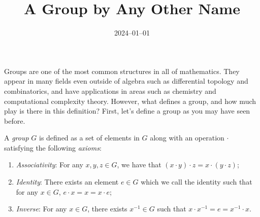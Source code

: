 \documentclass{article}
\title{A Group by Any \newline Other Name}
\date{2024--01--01}
\begin{document}
\maketitle


%

Groups are one of the most common structures in all of mathematics.
They appear in many fields even outside of algebra such as differential topology and combinatorics, and have applications in areas such as chemistry and computational complexity theory.
However, what defines a group, and how much play is there in this definition?
First, let's define a group as you may have seen before.

\begin{defn}\label{defn:grp}
  A \emph{group} $G$ is defined as a set of elements in $G$ along with an operation $\cdot$ satisfying the following \emph{axioms}:
  \begin{enumerate}
  \item \emph{Associativity}: For any $x, y, z \in G$, we have that $(x \cdot y) \cdot z = x \cdot (y \cdot z)$;
  \item \emph{Identity}: There exists an element $e \in G$ which we call the identity such that for any $x \in G$, $e \cdot x = x = x \cdot e$;
  \item \emph{Inverse}: For any $x \in G$, there exists $x^{-1} \in G$ such that $x \cdot x^{-1} = e = x^{-1} \cdot x$.
  \end{enumerate}
\end{defn}
\end{document}
